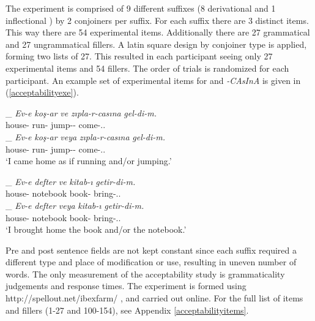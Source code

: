 The experiment is comprised of 9 different suffixes (8 derivational and 1 inflectional {\Acc}) by 2 conjoiners per suffix. For each suffix there are 3 distinct items. This way there are 54 experimental items. Additionally there are 27 grammatical and 27 ungrammatical fillers. A latin square design by conjoiner type is applied, forming two lists of 27. This resulted in each participant seeing only 27 experimental items and 54 fillers. The order of trials is randomized for each participant. An example set of experimental items for {\Acc} and \textit{-CAsInA} is given in (\ref{acceptabilityexe}).

\begin{exe}
    \ex \label{acceptabilityexe}
    \begin{xlist}
    \ex {\Der}\_{\And} \gll \textit{Ev-e} \textit{koş-ar} \textit{ve} \textit{zıpla-r-casına} \textit{gel-di-m.} \\ house-{\Dat} run-{\Aor} {\And} jump-{\Aor}-{\Der} come-{\Pst}.{\First}.{\Sg} \\
    
    \ex {\Der}\_{\Or} \gll \textit{Ev-e} \textit{koş-ar} \textit{veya} \textit{zıpla-r-casına} \textit{gel-di-m.} \\ house-{\Dat} run-{\Aor} {\Or} jump-{\Aor}-{\Der} come-{\Pst}.{\First}.{\Sg} \\
    \glt `I came home as if running and/or jumping.' 
 
    \ex {\Infl}\_{\And} \gll \textit{Ev-e} \textit{defter} \textit{ve} \textit{kitab-ı} \textit{getir-di-m.} \\ house-{\Dat} notebook {\And} book-{\Acc} bring-{\Pst}.{\First}.{\Sg} \\
    
    \ex {\Infl}\_{\Or} \gll \textit{Ev-e} \textit{defter} \textit{veya} \textit{kitab-ı} \textit{getir-di-m.} \\ house-{\Dat} notebook {\Or} book-{\Acc} bring-{\Pst}.{\First}.{\Sg} \\
    \glt `I brought home the book and/or the notebook.' 
    \end{xlist}
\end{exe}

Pre and post sentence fields are not kept constant since each suffix required a different type and place of modification or use, resulting in uneven number of words. The only measurement of the acceptability study is grammaticality judgements and response times. The experiment is formed using http://spellout.net/ibexfarm/ \citep{drummond2013ibex}, and carried out online. For the full list of items and fillers (1-27 and 100-154), see Appendix \ref{acceptabilityitems}.

